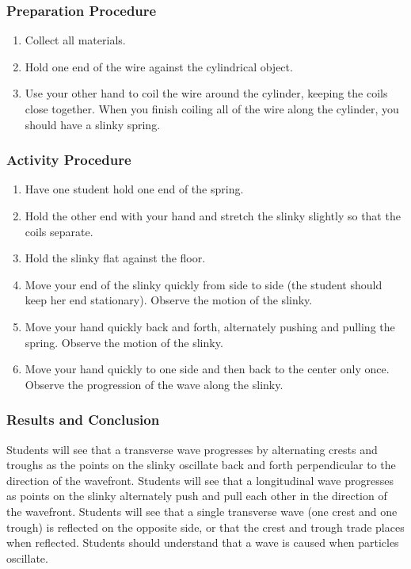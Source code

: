 \subsubsection*{Preparation Procedure}
\begin{enumerate}
\item{Collect all materials.} 
\item{Hold one end of the wire against the cylindrical object.} 
\item{Use your other hand to coil the wire around the cylinder, keeping the coils close together. When you finish coiling all of the wire along the cylinder, you should have a slinky spring.} 
\end{enumerate}

\subsubsection*{Activity Procedure}
\begin{enumerate}
\item{Have one student hold one end of the spring.} 
\item{Hold the other end with your hand and stretch the slinky slightly so that the coils separate.} 
\item{Hold the slinky flat against the floor.} 
\item{Move your end of the slinky quickly from side to side (the student should keep her end stationary). Observe the motion of the slinky.} 
\item{Move your hand quickly back and forth, alternately pushing and pulling the spring. Observe the motion of the slinky.} 
\item{Move your hand quickly to one side and then back to the center only once. Observe the progression of the wave along the slinky.} 
\end{enumerate}

\subsubsection*{Results and Conclusion}
Students will see that a transverse wave progresses by alternating crests and troughs as the points on the slinky oscillate back and forth perpendicular to the direction of the wavefront.  
Students will see that a longitudinal wave progresses as points on the slinky alternately push and pull each other in the direction of the wavefront.  
Students will see that a single transverse wave (one crest and one trough) is reflected on the opposite side, or that the crest and trough trade places when reflected.  
Students should understand that a wave is caused when particles oscillate.  

